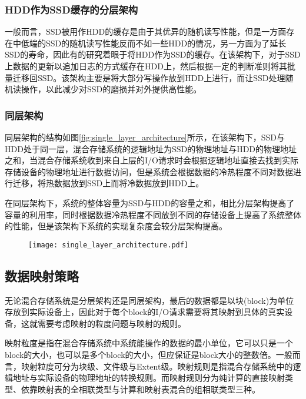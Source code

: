 \subsubsection{HDD作为SSD缓存的分层架构}

一般而言，SSD被用作HDD的缓存是由于其优异的随机读写性能，但是一方面存在中低端的SSD的随机读写性能反而不如一些HDD的情况，另一方面为了延长SSD的寿命，因此有的研究着眼于将HDD作为SSD的缓存\cite{soundararajan2010extending}。在该架构下，对于SSD上数据的更新以追加日志的方式缓存在HDD上，然后根据一定的判断准则将其批量迁移回SSD。该架构主要是将大部分写操作放到HDD上进行，而让SSD处理随机读操作，以此减少对SSD的磨损并对外提供高性能。

\subsubsection{同层架构}

同层架构的结构如图\ref{fig:single_layer_architecture}所示，在该架构下，SSD与HDD处于同一层，混合存储系统的逻辑地址为SSD的物理地址与HDD的物理地址之和，当混合存储系统收到来自上层的I/O请求时会根据逻辑地址直接去找到实际存储设备的物理地址进行数据访问，但是系统会根据数据的冷热程度不同对数据进行迁移，将热数据放到SSD上而将冷数据放到HDD上。

在同层架构下，系统的整体容量为SSD与HDD的容量之和，相比分层架构提高了容量的利用率，同时根据数据冷热程度不同放到不同的存储设备上提高了系统整体的性能，但是该架构下系统的实现复杂度会较分层架构提高。

\begin{figure}[!htp]
    \centering
    \texttt{[image: single\_layer\_architecture.pdf]}
\end{figure}

\subsection{数据映射策略}

无论混合存储系统是分层架构还是同层架构，最后的数据都是以块(block)为单位存放到实际设备上，因此对于每个block的I/O请求需要将其映射到具体的真实设备，这就需要考虑映射的粒度问题与映射的规则。

映射粒度是指在混合存储系统中系统能操作的数据的最小单位，它可以只是一个block的大小，也可以是多个block的大小，但应保证是block大小的整数倍。一般而言，映射粒度可分为块级、文件级与Extent级。映射规则是指混合存储系统中的逻辑地址与实际设备的物理地址的转换规则。而映射规则分为纯计算的直接映射类型、依靠映射表的全相联类型与计算和映射表混合的组相联类型三种。

